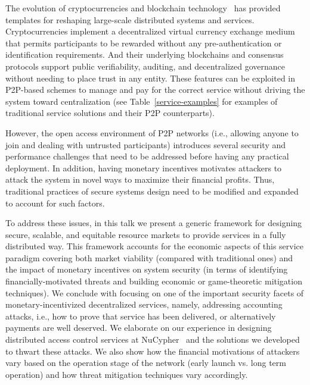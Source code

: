 \documentclass{llncs}
\begin{document}
The evolution of cryptocurrencies and blockchain technology~\cite{bitcoin,ethereum} has provided templates for reshaping large-scale distributed systems and services. Cryptocurrencies implement a decentralized virtual currency exchange medium that permits participants to be rewarded without any pre-authentication or identification requirements. And their underlying blockchains and consensus protocols support public verifiability, auditing, and decentralized governance without needing to place trust in any entity. These features can be exploited in P2P-based schemes to manage and pay for the correct service without driving the system toward centralization (see Table~\ref{service-examples} for examples of traditional service solutions and their P2P counterparts).


However, the open access environment of P2P networks (i.e., allowing anyone to join and dealing with untrusted participants) introduces several security and performance challenges that need to be addressed before having any practical deployment. In addition, having monetary incentives motivates attackers to attack the system in novel ways to maximize their financial profits. Thus, traditional practices of secure systems design need to be modified and expanded to account for such factors.


To address these issues, in this talk we present a generic framework for designing secure, scalable, and equitable resource markets to provide services in a fully distributed way. This framework accounts for the economic aspects of this service paradigm covering both market viability (compared with traditional ones) and the impact of monetary incentives on system security (in terms of identifying financially-motivated threats and building economic or game-theoretic mitigation techniques). We conclude with focusing on one of the important security facets of monetary-incentivized decentralized services, namely, addressing accounting attacks, i.e., how to prove that service has been delivered, or alternatively payments are well deserved. We elaborate on our experience in designing distributed access control services at NuCypher~\cite{nucypher} and the solutions we developed to thwart these attacks. We also show how the financial motivations of attackers vary based on the operation stage of the network (early launch vs. long term operation) and how threat mitigation techniques vary accordingly.
\end{document}
